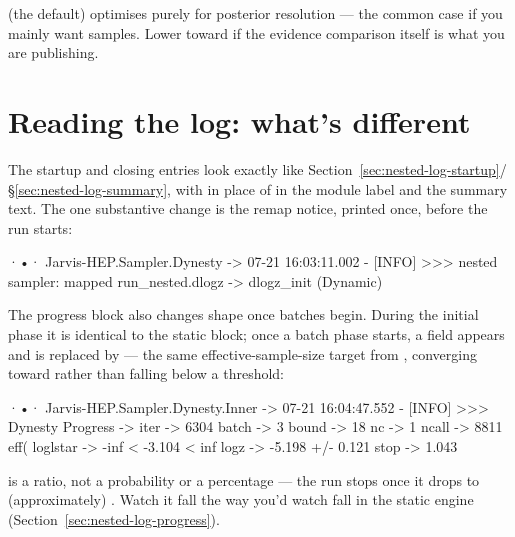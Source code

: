 \begin{jtip}
 (the default) optimises purely for posterior
resolution --- the common case if you mainly want samples. Lower  toward
 if the evidence comparison itself is what you are publishing.
\end{jtip}

\section{Reading the log: what's different}
\label{sec:dynesty-log}

The startup and closing entries look exactly like
Section~\ref{sec:nested-log-startup}/\S\ref{sec:nested-log-summary}, with 
in place of  in the module label and the summary text. The one
substantive change is the remap notice, printed once, before the run starts:

\begin{terminal}
\begin{jout}
·•· Jarvis-HEP.Sampler.Dynesty
	-> 07-21 16:03:11.002 - [INFO] >>>
nested sampler: mapped run_nested.dlogz -> dlogz_init (Dynamic)
\end{jout}
\end{terminal}

The progress block also changes shape once batches begin. During the initial phase it
is identical to the static block; once a batch phase starts, a  field
appears and  is replaced by  --- the same effective-sample-size
target from , converging toward  rather than falling
below a threshold:

\begin{terminal}
\begin{jout}
·•· Jarvis-HEP.Sampler.Dynesty.Inner
	-> 07-21 16:04:47.552 - [INFO] >>>
Dynesty Progress ->
	iter       -> 6304
	batch      -> 3
	bound      -> 18
	nc         -> 1
	ncall      -> 8811
	eff(%
	loglstar   -> -inf < -3.104 <  inf
	logz       ->  -5.198 +/- 0.121
	stop       ->   1.043
\end{jout}
\end{terminal}

\begin{jnote}
 is a ratio, not a probability or a percentage --- the run stops once it
drops to (approximately) . Watch it fall the way you'd watch 
fall in the static engine (Section~\ref{sec:nested-log-progress}).
\end{jnote}

